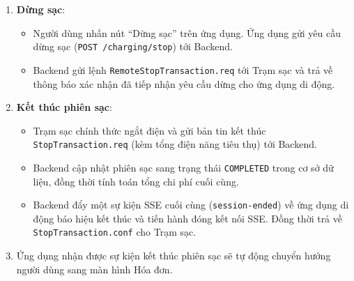 \begin{enumerate}[font=\bfseries]
\begin{itemize}
    \item Ứng dụng di động liên tục cập nhật giao diện hiển thị thông số sạc cho người dùng theo thời gian thực.
\end{itemize}
\item \textbf{Dừng sạc}:
\begin{itemize}
    \item Người dùng nhấn nút ``Dừng sạc'' trên ứng dụng. Ứng dụng gửi yêu cầu dừng sạc (\texttt{POST /charging/stop}) tới Backend.
    \item Backend gửi lệnh \texttt{RemoteStopTransaction.req} tới Trạm sạc và trả về thông báo xác nhận đã tiếp nhận yêu cầu dừng cho ứng dụng di động.
\end{itemize}
\item \textbf{Kết thúc phiên sạc}:
\begin{itemize}
    \item Trạm sạc chính thức ngắt điện và gửi bản tin kết thúc \texttt{StopTransaction.req} (kèm tổng điện năng tiêu thụ) tới Backend.
    \item Backend cập nhật phiên sạc sang trạng thái \texttt{COMPLETED} trong cơ sở dữ liệu, đồng thời tính toán tổng chi phí cuối cùng.
    \item Backend đẩy một sự kiện SSE cuối cùng (\texttt{session-ended}) về ứng dụng di động báo hiệu kết thúc và tiến hành đóng kết nối SSE. Đồng thời trả về \texttt{StopTransaction.conf} cho Trạm sạc.
\end{itemize}
\item Ứng dụng nhận được sự kiện kết thúc phiên sạc sẽ tự động chuyển hướng người dùng sang màn hình Hóa đơn.
\end{enumerate}
